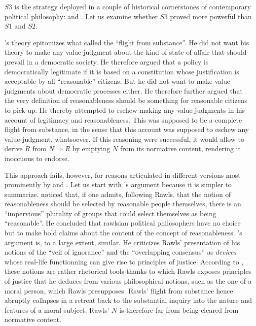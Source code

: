 \documentclass[preprint, french, english, 11pt, authoryear]{elsarticle}%
\begin{document}
$S3$ is the strategy deployed in a couple of historical cornerstones of contemporary political philosophy: \cite{rawls_political_2005} and \cite{habermas_moralbewustsein_1983}. Let us examine whether $S3$ proved more powerful than $S1$ and $S2$.

\cite{rawls_political_2005}'s theory epitomizes what \cite{estlund_democratic_2009} called the ``flight from substance''. He did not want his theory to make any value-judgment about the kind of state of affair that should prevail in a democratic society. He therefore argued that a policy is democratically legitimate if it is based on a constitution whose justification is acceptable by all  ``reasonable'' citizens. But he did not want to make value-judgments about democratic processes either. He therefore further argued that the very definition of reasonableness should be something for reasonable citizens to pick-up. He thereby attempted to eschew making any value-judgments in his account of legitimacy and reasonableness. This was supposed to be a complete flight from substance, in the sense that this account was supposed to eschew any value-judgment, whatsoever. If this reasoning were successful, it would allow to derive $R$ from $N ⇒ R$ by emptying $N$ from its normative content, rendering it inoccuous to endorse.

This approach fails, however, for reasons articulated in different versions most prominently by \cite{habermas_reconciliation_1995} and \cite{estlund_democratic_2009}. Let us start with \cite{estlund_democratic_2009}'s argument because it is simpler to summarize. \cite{estlund_democratic_2009} noticed that, if one admits, following Rawls, that the notion of reasonableness should be selected by reasonable people themselves, there is an ``impervious'' plurality of groups that could select themselves as being ``reasonable''. He concluded that rawlsian political philosophers have no choice but to make bold claims about the content of the concept of reasonableness. \cite{habermas_reconciliation_1995}'s argument is, to a large extent, similar. He criticizes Rawls' presentation of his notions of the ``veil of ignorance'' and the ``overlapping consensus'' as \emph{devices} whose real-life functionning can give rise to principles of justice. According to \cite{habermas_reconciliation_1995}, these notions are rather rhetorical tools thanks to which Rawls exposes principles of justice that he deduces from various philosophical notions, such as the one of a moral person, which Rawls presupposes. Rawls' flight from substance hence abruptly collapses in a retreat back to the substantial inquiry into the nature and features of a moral subject.  Rawls' $N$ is therefore far from being cleared from normative content.
\end{document}
